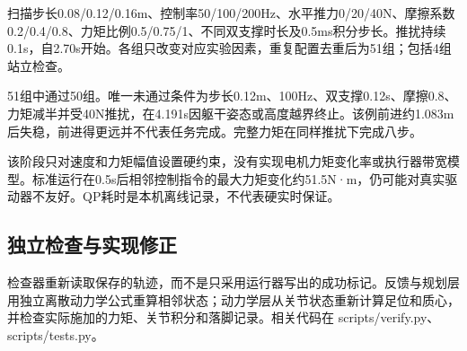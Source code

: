 扫描步长0.08/0.12/0.16m、控制率50/100/200Hz、水平推力0/20/40N、摩擦系数0.2/0.4/0.8、力矩比例0.5/0.75/1、不同双支撑时长及0.5ms积分步长。推扰持续0.1s，自2.70s开始。各组只改变对应实验因素，重复配置去重后为51组；包括4组站立检查。


51组中通过50组。唯一未通过条件为步长0.12m、100Hz、双支撑0.12s、摩擦0.8、力矩减半并受40N推扰，在4.191s因躯干姿态或高度越界终止。该例前进约1.083m后失稳，前进得更远并不代表任务完成。完整力矩在同样推扰下完成八步。


该阶段只对速度和力矩幅值设置硬约束，没有实现电机力矩变化率或执行器带宽模型。标准运行在0.5s后相邻控制指令的最大力矩变化约51.5N·m，仍可能对真实驱动器不友好。QP耗时是本机离线记录，不代表硬实时保证。

\subsection{独立检查与实现修正}\label{s21-detail-5}

检查器重新读取保存的轨迹，而不是只采用运行器写出的成功标记。反馈与规划层用独立离散动力学公式重算相邻状态；动力学层从关节状态重新计算足位和质心，并检查实际施加的力矩、关节积分和落脚记录。相关代码在 scripts/verify.py、scripts/tests.py。

